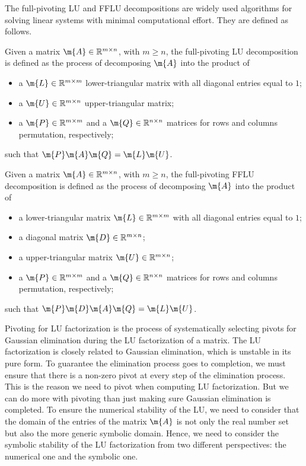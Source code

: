 The full-pivoting \ac{LU} and \ac{FFLU} decompositions are widely used algorithms for solving linear systems with minimal computational effort. They are defined as follows.
%
\begin{definition}
  Given a matrix $\m{A} \in \mathbb{R}^{m \times n}$, with $m \geq n$, the full-pivoting \ac{LU} decomposition is defined as the process of decomposing $\m{A}$ into the product of
  \begin{itemize}
    \setlength{\itemsep}{0.0em}
    \item a $\m{L} \in \mathbb{R}^{m \times m}$ lower-triangular matrix with all diagonal entries equal to $1$;
    \item a $\m{U} \in \mathbb{R}^{m \times n}$ upper-triangular matrix;
    \item a $\m{P} \in \mathbb{R}^{m \times m}$ and a $\m{Q} \in \mathbb{R}^{n \times n}$ matrices for rows and columns permutation, respectively;
  \end{itemize}
  such that $\m{P}\m{A}\m{Q} = \m{L}\m{U}$.
\end{definition}
%
\begin{definition}
  Given a matrix $\m{A} \in \mathbb{R}^{m \times n}$, with $m \geq n$, the full-pivoting \ac{FFLU} decomposition is defined as the process of decomposing $\m{A}$ into the product of
  \begin{itemize}
    \setlength{\itemsep}{0.0em}
    \item a lower-triangular matrix $\m{L} \in \mathbb{R}^{m \times m}$ with all diagonal entries equal to $1$;
    \item a diagonal matrix $\m{D} \in \mathbb{R}^{m \times n}$;
    \item a upper-triangular matrix $\m{U} \in \mathbb{R}^{m \times n}$;
    \item a $\m{P} \in \mathbb{R}^{m \times m}$ and a $\m{Q} \in \mathbb{R}^{n \times n}$ matrices for rows and columns permutation, respectively;
  \end{itemize}
  such that $\m{P}\m{D}\m{A}\m{Q} = \m{L}\m{U}$.
\end{definition}
%
Pivoting for \ac{LU} factorization is the process of systematically selecting pivots for Gaussian elimination during the \ac{LU} factorization of a matrix. The \ac{LU} factorization is closely related to Gaussian elimination, which is unstable in its pure form. To guarantee the elimination process goes to completion, we must ensure that there is a non-zero pivot at every step of the elimination process. This is the reason we need to pivot when computing \ac{LU} factorization. But we can do more with pivoting than just making sure Gaussian elimination is completed. To ensure the numerical stability of the \ac{LU}, we need to consider that the domain of the entries of the matrix $\m{A}$ is not only the real number set but also the more generic symbolic domain. Hence, we need to consider the symbolic stability of the \ac{LU} factorization from two different perspectives: the numerical one and the symbolic one.

